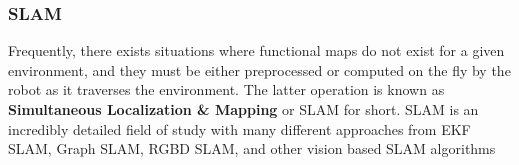 





\subsubsection{SLAM}
Frequently, there exists situations where functional maps do not exist for a given environment, and they must be either preprocessed or computed on the fly by the robot as it traverses the environment. The latter operation is known as \textbf{Simultaneous Localization \& Mapping} or SLAM for short. SLAM is an incredibly detailed field of study with many different approaches from EKF SLAM, Graph SLAM, RGBD SLAM, and other vision based SLAM algorithms

